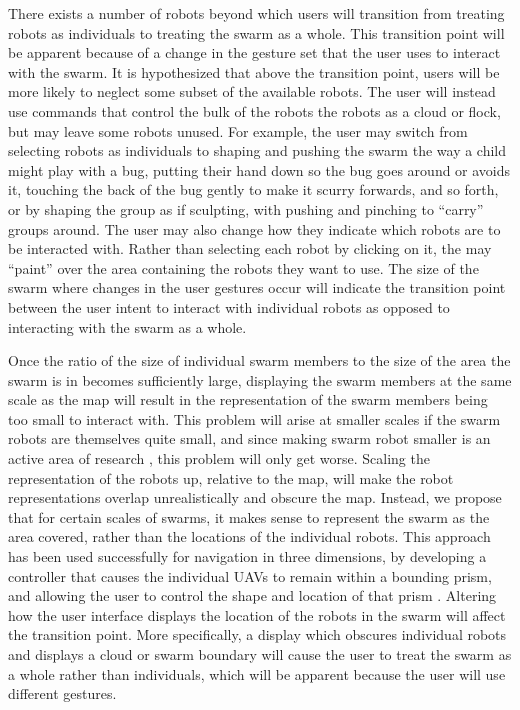 \documentclass[]{article}
\begin{document}
There exists a number of robots beyond which users will transition from treating robots as individuals to treating the swarm as a whole. 
This transition point will be apparent because of a change in the gesture set that the user uses to interact with the swarm. 
It is hypothesized that above the transition point, users will be more likely to neglect some subset of the available robots. 
The user will instead use commands that control the bulk of the robots the robots as a cloud or flock, but may leave some robots unused. 
For example, the user may switch from selecting robots as individuals to shaping and pushing the swarm the way a child might play with a bug, putting their hand down so the bug goes around or avoids it, touching the back of the bug gently to make it scurry forwards, and so forth, or by shaping the group as if sculpting, with pushing and pinching to ``carry'' groups around. 
The user may also change how they indicate which robots are to be interacted with. 
Rather than selecting each robot by clicking on it, the may ``paint'' over the area containing the robots they want to use. 
The size of the swarm where changes in the user gestures occur will indicate the transition point between the user intent to interact with individual robots as opposed to interacting with the swarm as a whole. 

Once the ratio of the size of individual swarm members to the size of the area the swarm is in becomes sufficiently large, displaying the swarm members at the same scale as the map will result in the representation of the swarm members being too small to interact with. 
This problem will arise at smaller scales if the swarm robots are themselves quite small, and since making swarm robot smaller is an active area of research , this problem will only get worse. 
Scaling the representation of the robots up, relative to the map, will make the robot representations overlap unrealistically and obscure the map. 
Instead, we propose that for certain scales of swarms, it makes sense to represent the swarm as the area covered, rather than the locations of the individual robots.
This approach has been used successfully for navigation in three dimensions, by developing a controller that causes the individual UAVs to remain within a bounding prism, and allowing the user to control the shape and location of that prism \cite{ayanian2014controlling}.
Altering how the user interface displays the location of the robots in the swarm will affect the transition point. 
More specifically, a display which obscures individual robots and displays a cloud or swarm boundary will cause the user to treat the swarm as a whole rather than individuals, which will be apparent because the user will use different gestures. 
\end{document}
